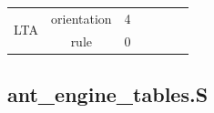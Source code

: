 \documentclass[a4paper, 10pt, twoside, notitlepage]{article}
\begin{document}
\begin{table}[htp]
\begin{tabular}{cccllll}
\multicolumn{1}{|c|}{\multirow{2}{*}{LTA}} & \multicolumn{1}{c|}{orientation}       & \multicolumn{1}{c|}{4}                 &                       &                                           &                                        &                                        \\ \cline{2-3}
\multicolumn{1}{|c|}{}                     & \multicolumn{1}{c|}{rule}              & \multicolumn{1}{c|}{0}                 &                       &                                           &                                        &                                        \\ \cline{1-3}
\end{tabular}
\end{table}

\subsection{ant\_engine\_tables.S}
\end{document}
